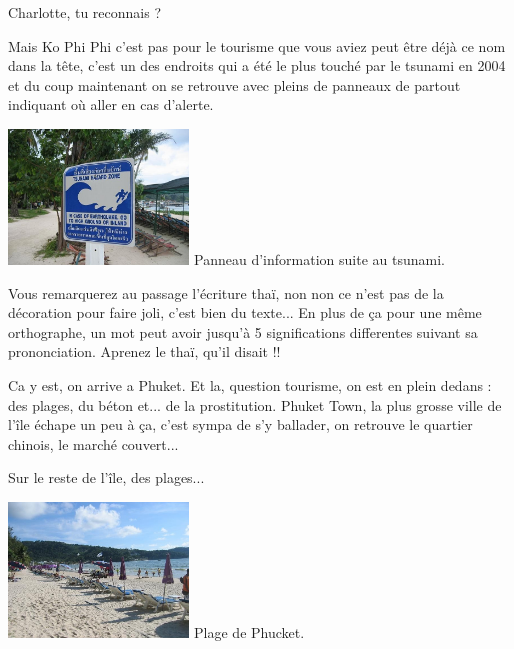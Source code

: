 \begin{multicols}{2}
Charlotte, tu reconnais ?

Mais Ko Phi Phi c'est pas pour le tourisme que vous aviez peut être déjà ce nom dans la tête, c'est un des endroits qui a été le plus touché par le tsunami en 2004 et du coup maintenant on se retrouve avec pleins de panneaux de partout indiquant où aller en cas d'alerte.

\hspace*{-0.65cm}
\includegraphics[width=4.8cm]{articles/Phucket/12121623755piH.jpg}
Panneau d'information suite au tsunami.

Vous remarquerez au passage l'écriture thaï, non non ce n'est pas de la décoration pour faire joli, c'est bien du texte... En plus de ça pour une même orthographe, un mot peut avoir jusqu'à 5 significations differentes suivant sa prononciation. Aprenez le thaï, qu'il disait !!

Ca y est, on arrive a Phuket. Et la, question tourisme, on est en plein dedans : des plages, du béton et... de la prostitution. Phuket Town, la plus grosse ville de l'île échape un peu à ça, c'est sympa de s'y ballader, on retrouve le quartier chinois, le marché couvert...


Sur le reste de l'île, des plages...

\hspace*{-0.65cm}
\includegraphics[width=4.8cm]{articles/Phucket/1212162370ANUw.jpg}
Plage de Phucket.


\end{multicols}
